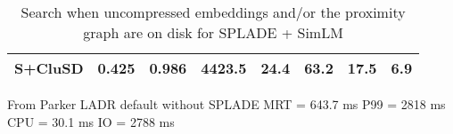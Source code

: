 {\begin{table}[htbp]
{\begin{tabular}{r |lll|ll|rr}
    S+CluSD& 0.425 & 0.986  & 4423.5& 24.4 & 63.2 & 17.5 & 6.9\\
                \hline\hline
                \end{tabular}  }
        \caption{Search when uncompressed embeddings and/or the proximity graph are on disk for SPLADE + SimLM}
        \label{tab:disktime}
\end{table}

From Parker
LADR default without SPLADE
MRT = 643.7 ms
P99 = 2818 ms
CPU = 30.1 ms
IO = 2788 ms
}
